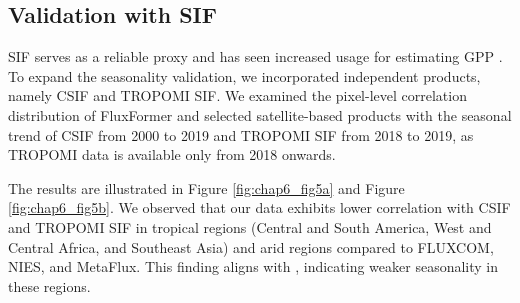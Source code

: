 \subsection{Validation with SIF}
SIF serves as a reliable proxy and has seen increased usage for estimating GPP \citep{norton2019estimating, liu2020improving, bai2022estimation}. To expand the seasonality validation, we incorporated independent products, namely CSIF and TROPOMI SIF. We examined the pixel-level correlation distribution of FluxFormer and selected satellite-based products with the seasonal trend of CSIF from 2000 to 2019 and TROPOMI SIF from 2018 to 2019, as TROPOMI data is available only from 2018 onwards.\par

The results are illustrated in Figure \ref{fig:chap6_fig5a} and Figure \ref{fig:chap6_fig5b}. We observed that our data exhibits lower correlation with CSIF and TROPOMI SIF in tropical regions (Central and South America, West and Central Africa, and Southeast Asia) and arid regions compared to FLUXCOM, NIES, and MetaFlux. This finding aligns with \citep{sanders2016spaceborne}, indicating weaker seasonality in these regions.\par
